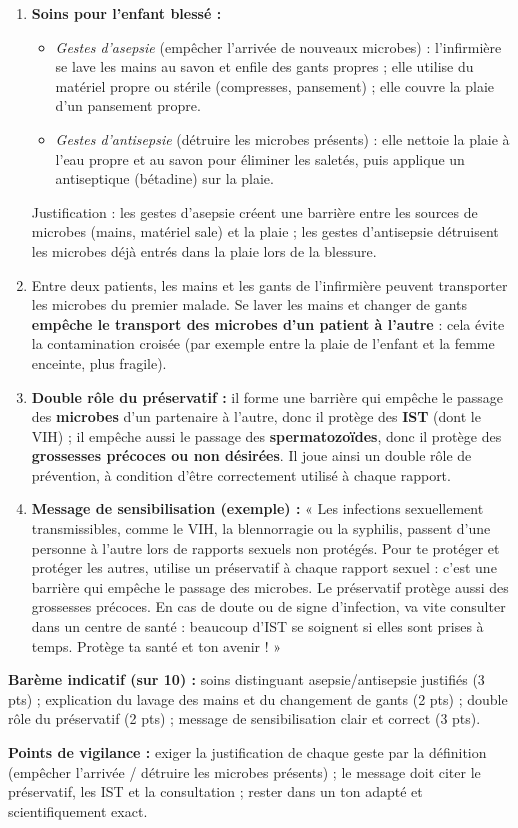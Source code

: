 \documentclass[11pt]{article}
\begin{document}
\begin{corrige}
\begin{enumerate}
\item \textbf{Soins pour l'enfant blessé :}
\begin{itemize}
\item \emph{Gestes d'asepsie} (empêcher l'arrivée de nouveaux microbes) : l'infirmière se lave les mains au savon et enfile des gants propres ; elle utilise du matériel propre ou stérile (compresses, pansement) ; elle couvre la plaie d'un pansement propre.
\item \emph{Gestes d'antisepsie} (détruire les microbes présents) : elle nettoie la plaie à l'eau propre et au savon pour éliminer les saletés, puis applique un antiseptique (bétadine) sur la plaie.
\end{itemize}
Justification : les gestes d'asepsie créent une barrière entre les sources de microbes (mains, matériel sale) et la plaie ; les gestes d'antisepsie détruisent les microbes déjà entrés dans la plaie lors de la blessure.
\item Entre deux patients, les mains et les gants de l'infirmière peuvent transporter les microbes du premier malade. Se laver les mains et changer de gants \textbf{empêche le transport des microbes d'un patient à l'autre} : cela évite la contamination croisée (par exemple entre la plaie de l'enfant et la femme enceinte, plus fragile).
\item \textbf{Double rôle du préservatif :} il forme une barrière qui empêche le passage des \textbf{microbes} d'un partenaire à l'autre, donc il protège des \textbf{IST} (dont le VIH) ; il empêche aussi le passage des \textbf{spermatozoïdes}, donc il protège des \textbf{grossesses précoces ou non désirées}. Il joue ainsi un double rôle de prévention, à condition d'être correctement utilisé à chaque rapport.
\item \textbf{Message de sensibilisation (exemple) :} « Les infections sexuellement transmissibles, comme le VIH, la blennorragie ou la syphilis, passent d'une personne à l'autre lors de rapports sexuels non protégés. Pour te protéger et protéger les autres, utilise un préservatif à chaque rapport sexuel : c'est une barrière qui empêche le passage des microbes. Le préservatif protège aussi des grossesses précoces. En cas de doute ou de signe d'infection, va vite consulter dans un centre de santé : beaucoup d'IST se soignent si elles sont prises à temps. Protège ta santé et ton avenir ! »
\end{enumerate}
\textbf{Barème indicatif (sur 10) :} soins distinguant asepsie/antisepsie justifiés (3 pts) ; explication du lavage des mains et du changement de gants (2 pts) ; double rôle du préservatif (2 pts) ; message de sensibilisation clair et correct (3 pts).

\textbf{Points de vigilance :} exiger la justification de chaque geste par la définition (empêcher l'arrivée / détruire les microbes présents) ; le message doit citer le préservatif, les IST et la consultation ; rester dans un ton adapté et scientifiquement exact.
\end{corrige}
\end{document}

